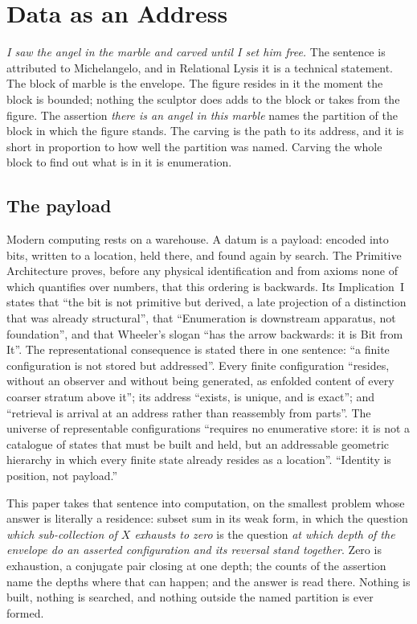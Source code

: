 \documentclass[pdflatex,sn-mathphys-num]{sn-jnl}
\theoremstyle{thmstyleone}%
\theoremstyle{thmstyletwo}%
\theoremstyle{thmstylethree}%
\newcommand{\PA}{\cite{Swanagon2026PA}}
\newcommand{\q}[1]{``#1''}        %
\begin{document}
\section{Data as an Address}\label{sec:address}
\emph{I saw the angel in the marble and carved until I set him free.} The sentence is attributed to Michelangelo, and in Relational Lysis it is a technical statement. The block of marble is the envelope. The figure resides in it the moment the block is bounded; nothing the sculptor does adds to the block or takes from the figure. The assertion \emph{there is an angel in this marble} names the partition of the block in which the figure stands. The carving is the path to its address, and it is short in proportion to how well the partition was named. Carving the whole block to find out what is in it is enumeration.

\subsection{The payload}
Modern computing rests on a warehouse. A datum is a payload: encoded into bits, written to a location, held there, and found again by search. The Primitive Architecture \PA{} proves, before any physical identification and from axioms none of which quantifies over numbers, that this ordering is backwards. Its Implication~I states that \q{the bit is not primitive but derived, a late projection of a distinction that was already structural}, that \q{Enumeration is downstream apparatus, not foundation}, and that Wheeler's slogan \q{has the arrow backwards: it is Bit from It}. The representational consequence is stated there in one sentence: \q{a finite configuration is not stored but addressed}. Every finite configuration \q{resides, without an observer and without being generated, as enfolded content of every coarser stratum above it}; its address \q{exists, is unique, and is exact}; and \q{retrieval is arrival at an address rather than reassembly from parts}. The universe of representable configurations \q{requires no enumerative store: it is not a catalogue of states that must be built and held, but an addressable geometric hierarchy in which every finite state already resides as a location}. \q{Identity is position, not payload.}

This paper takes that sentence into computation, on the smallest problem whose answer is literally a residence: subset sum in its weak form, in which the question \emph{which sub-collection of $X$ exhausts to zero} is the question \emph{at which depth of the envelope do an asserted configuration and its reversal stand together}. Zero is exhaustion, a conjugate pair closing at one depth; the counts of the assertion name the depths where that can happen; and the answer is read there. Nothing is built, nothing is searched, and nothing outside the named partition is ever formed.
\end{document}
